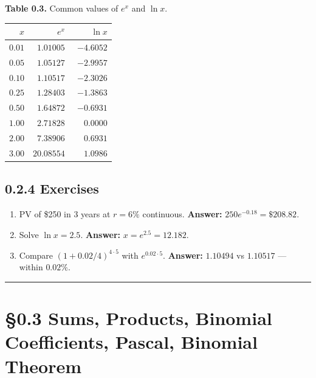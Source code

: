 \documentclass[
  10pt,
  twoside]{book}
\newcounter{none} %
\providecommand{\tightlist}{%
  \setlength{\itemsep}{0pt}\setlength{\parskip}{0pt}}
\begin{document}
\textbf{Table 0.3.} Common values of \(e^x\) and \(\ln x\).

{\def\LTcaptype{none} %
\begin{table}[H]
\centering
\begin{tabular}{|r|r|r|}
\toprule
\(x\) & \(e^x\) & \(\ln x\) \\
\midrule



\(0.01\) & \(\phantom{0}1.01005\) & \(-4.6052\) \\
\(0.05\) & \(\phantom{0}1.05127\) & \(-2.9957\) \\
\(0.10\) & \(\phantom{0}1.10517\) & \(-2.3026\) \\
\(0.25\) & \(\phantom{0}1.28403\) & \(-1.3863\) \\
\(0.50\) & \(\phantom{0}1.64872\) & \(-0.6931\) \\
\(1.00\) & \(\phantom{0}2.71828\) & \(\phantom{-}0.0000\) \\
\(2.00\) & \(\phantom{0}7.38906\) & \(\phantom{-}0.6931\) \\
\(3.00\) & \(20.08554\) & \(\phantom{-}1.0986\) \\
\bottomrule
\end{tabular}
\end{table}
}

\subsection{0.2.4 Exercises}\label{exercises-1}

\begin{enumerate}
\def\labelenumi{\arabic{enumi}.}
\tightlist
\item
  PV of \$250 in 3 years at \(r = 6\%\) continuous. \textbf{Answer:}
  \(250 e^{-0.18} = \$208.82\).
\item
  Solve \(\ln x = 2.5\). \textbf{Answer:} \(x = e^{2.5} = 12.182\).
\item
  Compare \((1 + 0.02/4)^{4 \cdot 5}\) with \(e^{0.02 \cdot 5}\).
  \textbf{Answer:} \(1.10494\) vs \(1.10517\) --- within \(0.02\%\).
\end{enumerate}

\begin{center}\rule{0.5\linewidth}{0.5pt}\end{center}

\section{§0.3 Sums, Products, Binomial Coefficients, Pascal, Binomial
Theorem}\label{sums-products-binomial-coefficients-pascal-binomial-theorem}
\end{document}
